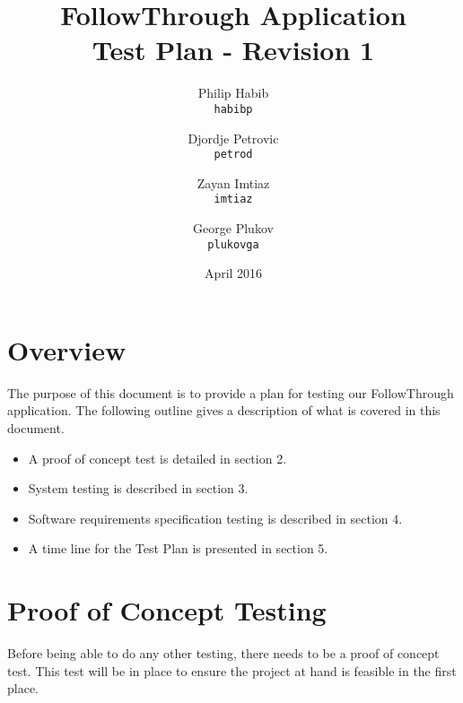 \documentclass{article}
\begin{document}
\title{\textbf{FollowThrough Application \\
 Test Plan - Revision 1}}
\author{
  Philip Habib\\ \texttt{habibp} \and Djordje Petrovic \\ \texttt{petrod} \and Zayan Imtiaz\\ \texttt{imtiaz} \and George Plukov\\ \texttt{plukovga}
}

\date{April 2016}

\maketitle

\newpage
\tableofcontents
\newpage

\section{Overview}
The purpose of this document is to provide a plan for testing our FollowThrough application. The following outline gives a description of what is covered in this document. 

\begin{itemize}
    \item A proof of concept test is detailed in section 2. 
    \item System testing is described in section 3. 
    \item Software requirements specification testing is described in section 4. 
    \item A time line for the Test Plan is presented in section 5. 
\end{itemize}

\section{Proof of Concept Testing}
Before being able to do any other testing, there needs to be a proof of concept test. This test will be in place to ensure the project at hand is feasible in the first place.
\end{document}
